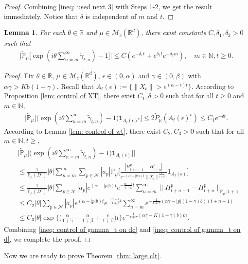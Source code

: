 \documentclass[12pt,a4paper]{amsart}
\theoremstyle{plain}
\newtheorem{lem}[thm]{Lemma}
\theoremstyle{definition}
\numberwithin{equation}{section}
\begin{document}
\begin{proof}
    Combining \eqref{ineq: used next 3} with Steps 1-2, we get the result immediately. Notice that $\delta$ is independent of $m$ and $t$.
\end{proof}
\begin{lem}\label{lem: lemma05}
    For each $\theta\in \mathbb{R}$ and $\mu \in \mathcal{M}_c(\mathbb{R}^d)$, there exist constants $C,\delta_1,\delta_2>0$ such that
\begin{align}
    \Big|\widetilde{\mathbb{P}}_{\mu}\Big[\exp(i\theta \sum_{n=m}^{\infty}\widetilde{\gamma}_{t,n})-1\Big]\Big|
    \leq C(e^{-\delta_1 t}+e^{\delta_1 t}e^{-\delta_2 m}),
    \quad m\in \mathbb{N}, t\geq 0.
\end{align}
\end{lem}
\begin{proof}
    Fix $\theta \in \mathbb R$, $\mu \in \mathcal M_c(\mathbb R^d)$, $\epsilon \in (0,\alpha)$ and $\gamma \in (0,\beta)$ with $\alpha \gamma > Kb(1+\gamma)$.
    Recall that $A_t(\epsilon):=\{\|X_t\|> e^{(\alpha-\epsilon) t}\}$.
    According to Proposition \ref{lem: control of XT}, there exist $C_1,\delta>0$ such that for all $t\geq 0$ and $m\in \mathbb N$,
\begin{align}\label{ineq: control of gamma_t on dc}
    \Big|\widetilde{\mathbb{P}}_{\mu}\Big[\big(\exp(i\theta \sum_{n=m}^{\infty}\widetilde{\gamma}_{t,n})-1\big)\mathbf{1}_{A_t(\epsilon)^c}\Big]
    \leq 2\widetilde{P}_{\mu}(A_t(\epsilon)^c)
    \leq C_1 e^{-\delta t}.
\end{align}
    According to Lemma \ref{lem: control of wt}, there exist $C_2,C_3>0$
    such that for all $m\in \mathbb{N}, t\geq$,
\begin{align}\label{ineq: control of gamma_t on d}
    &\Big|\widetilde{\mathbb{P}}_{\mu}\Big[\big(\exp(i\theta \sum_{n=m}^{\infty}\widetilde{\gamma}_{t,n})-1\big)\mathbf{1}_{A_t(\epsilon)}\Big]\Big|\\
    &\leq \frac{1}{\mathbb{P}_{\mu}(D^c)}|\theta|\sum_{n=m}^{\infty}\sum_{p\in \mathcal{N}}|a_p|\mathbb{P}_{\mu}\Big[\frac{|H_{t+n-1}^p-H_{t+n}^p|}{e^{-(\alpha-|p|b)t}\|X_t\|^{\frac{1}{1+\beta}}}\mathbf{1}_{A_t(\epsilon)}\Big]\\
    &\leq  \frac{1}{\mathbb{P}_{\mu}(D^c)}|\theta|\sum_{p\in \mathcal{N}}|a_p|e^{(\alpha-|p|b)t}e^{-\frac{\alpha-\epsilon}{1+\beta}t}\sum_{n=m}^{\infty}\|H_{t+n-1}^p-H_{t+n}^p\|_{\mathbb{P}_{\mu};1+\gamma}\\
    &\leq C_2|\theta|\sum_{p\in \mathcal{N}}|a_p|e^{(\alpha-|p|b)t}e^{-\frac{\alpha-\epsilon}{1+\beta}t}\sum_{n=m}^{\infty}e^{-\frac{1}{1+\gamma}(\alpha\gamma-|p|(1+\gamma)b)(t+n-1)}\\
    &\leq C_3|\theta|\exp\Big\{\Big(\frac{\alpha}{1+\gamma}-\frac{\alpha}{1+\beta}+\frac{\epsilon}{1+\beta}\Big)t\Big\}
    e^{-\frac{1}{1+\gamma}(\alpha\gamma-K(1+\gamma)b)m}.
\end{align}
    Combining \eqref{ineq: control of gamma_t on dc} and \eqref{ineq: control of gamma_t on d}, we complete the proof.
\end{proof}
    Now we are ready to prove Theorem \ref{thm: large clt}.
\bigskip
\end{document}
